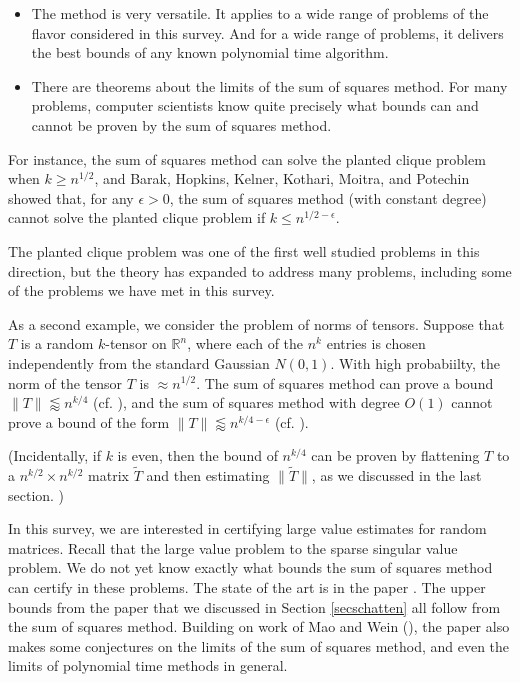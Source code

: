 \documentclass{amsart}
\newcommand{\RR}{\mathbb{R}}
\begin{document}
\begin{itemize}

\item The method is very versatile.  It applies to a wide range of problems of the flavor considered in this survey.  And for a wide range of problems, it delivers the best bounds of any known polynomial time algorithm.

\item There are theorems about the limits of the sum of squares method.  For many problems, computer scientists know quite precisely what bounds can and cannot be proven by the sum of squares method.

\end{itemize}

For instance, the sum of squares method can solve the planted clique problem when $k \ge n^{1/2}$,  and Barak, Hopkins, Kelner, Kothari,  Moitra,  and Potechin \cite{BHKKMP} showed that, for any $\epsilon > 0$, the sum of squares method (with constant degree) cannot solve the planted clique problem if $k \le n^{1/2 - \epsilon}$.  

The planted clique problem was one of the first well studied problems in this direction, but the theory has expanded to address many problems, including some of the problems we have met in this survey.

As a second example, we consider the problem of norms of tensors.  Suppose that $T$ is a random $k$-tensor on $\RR^n$, where each of the $n^k$ entries is chosen independently from the standard Gaussian $N(0,1)$.  With high probabiilty, the norm of the tensor $T$ is $\approx n^{1/2}$.  The sum of squares method can prove a bound $\| T \| \lessapprox n^{k/4}$ (cf.  \cite{HSS}),  and the sum of squares method with degree $O(1)$ cannot prove a bound of the form $\| T \| \lessapprox n^{k/4 - \epsilon}$ (cf.  \cite{PR}).

(Incidentally, if $k$ is even, then the bound of $n^{k/4}$ can be proven by flattening $T$ to a $n^{k/2} \times n^{k/2}$ matrix $\tilde T$ and then estimating $\| \tilde T \|$, as we discussed in the last section. )

In this survey, we are interested in certifying large value estimates for random matrices.  Recall that the large value problem to the sparse singular value problem.   We do not yet know exactly what bounds the sum of squares method can certify in these problems.  The state of the art is in the paper \cite{DHPT}.   The upper bounds from the paper \cite{DHPT} that we discussed in Section \ref{secschatten} all follow from the sum of squares method.  Building on work of Mao and Wein (\cite{MW}), the paper also makes some conjectures on the limits of the sum of squares method, and even the limits of polynomial time methods in general.
\end{document}
